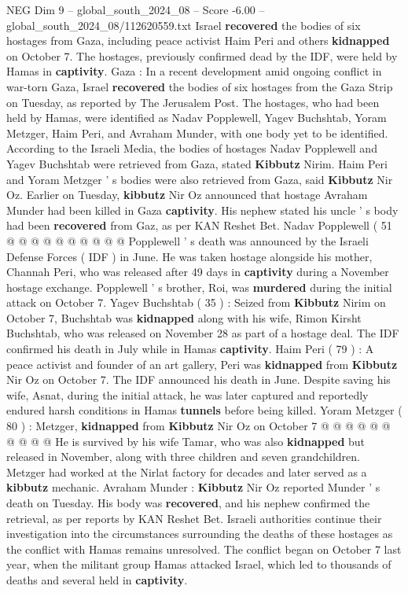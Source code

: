 \begin{textsample}{NEG Dim 9 – global\_south\_2024\_08 – Score -6.00 – global\_south\_2024\_08/112620559.txt}  \label{ex:f9_neg_381}
Israel \textbf{recovered} the bodies of six hostages from Gaza, including peace activist Haim Peri and others \textbf{kidnapped} on October 7.
The hostages, previously confirmed dead by the IDF, were held by Hamas in \textbf{captivity}.
Gaza : In a recent development amid ongoing conflict in war-torn Gaza, Israel \textbf{recovered} the bodies of six hostages from the Gaza Strip on Tuesday, as reported by The Jerusalem Post.
The hostages, who had been held by Hamas, were identified as Nadav Popplewell, Yagev Buchshtab, Yoram Metzger, Haim Peri, and Avraham Munder, with one body yet to be identified.
According to the Israeli Media, the bodies of hostages Nadav Popplewell and Yagev Buchshtab were retrieved from Gaza, stated \textbf{Kibbutz} Nirim.
Haim Peri and Yoram Metzger ' s bodies were also retrieved from Gaza, said \textbf{Kibbutz} Nir Oz.
Earlier on Tuesday, \textbf{kibbutz} Nir Oz announced that hostage Avraham Munder had been killed in Gaza \textbf{captivity}.
His nephew stated his uncle ' s body had been \textbf{recovered} from Gaz, as per KAN Reshet Bet.
Nadav Popplewell ( 51 @ @ @ @ @ @ @ @ @ @ Popplewell ' s death was announced by the Israeli Defense Forces ( IDF ) in June.
He was taken hostage alongside his mother, Channah Peri, who was released after 49 days in \textbf{captivity} during a November hostage exchange.
Popplewell ' s brother, Roi, was \textbf{murdered} during the initial attack on October 7.
Yagev Buchshtab ( 35 ) : Seized from \textbf{Kibbutz} Nirim on October 7, Buchshtab was \textbf{kidnapped} along with his wife, Rimon Kirsht Buchshtab, who was released on November 28 as part of a hostage deal.
The IDF confirmed his death in July while in Hamas \textbf{captivity}.
Haim Peri ( 79 ) : A peace activist and founder of an art gallery, Peri was \textbf{kidnapped} from \textbf{Kibbutz} Nir Oz on October 7.
The IDF announced his death in June.
Despite saving his wife, Asnat, during the initial attack, he was later captured and reportedly endured harsh conditions in Hamas \textbf{tunnels} before being killed.
Yoram Metzger ( 80 ) : Metzger, \textbf{kidnapped} from \textbf{Kibbutz} Nir Oz on October 7 @ @ @ @ @ @ @ @ @ @ He is survived by his wife Tamar, who was also \textbf{kidnapped} but released in November, along with three children and seven grandchildren.
Metzger had worked at the Nirlat factory for decades and later served as a \textbf{kibbutz} mechanic.
Avraham Munder : \textbf{Kibbutz} Nir Oz reported Munder ' s death on Tuesday.
His body was \textbf{recovered}, and his nephew confirmed the retrieval, as per reports by KAN Reshet Bet.
Israeli authorities continue their investigation into the circumstances surrounding the deaths of these hostages as the conflict with Hamas remains unresolved.
The conflict began on October 7 last year, when the militant group Hamas attacked Israel, which led to thousands of deaths and several held in \textbf{captivity}.

\end{textsample}
